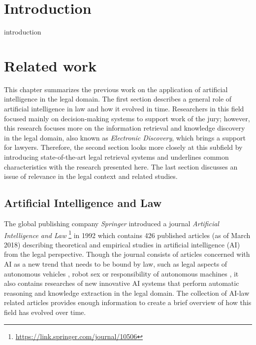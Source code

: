 \documentclass[
  digital, %
  notable,   %
  nolof,     %
  nolot,     %
  draft
]{fithesis3}
\begin{document}
\chapter*{Introduction}

introduction

\chapter{Related work}
This chapter summarizes the previous work on the application of artificial intelligence in the legal domain. 
The first section describes a general role of artificial intelligence in law and how it evolved in time.
Researchers in this field focused mainly on decision-making systems to support work of the jury; however, this research focuses more on the information retrieval and knowledge discovery in the legal domain, also known as \textit{Electronic Discovery}, which brings a support for lawyers.
Therefore, the second section looks more closely at this subfield by introducing state-of-the-art legal retrieval systems and underlines common characteristics with the research presented here.
The last section discusses an issue of relevance in the legal context and related studies.

\section{Artificial Intelligence and Law}
The global publishing company \textit{Springer} introduced a journal \textit{Artificial Intelligence and Law} \footnote{\url{https://link.springer.com/journal/10506}} in 1992 which contains 426 published articles (as of March 2018) describing theoretical and empirical studies in artificial intelligence (AI) from the legal perspective.
Though the journal consists of articles concerned with AI as a new trend that needs to be bound by law, such as legal aspects of autonomous vehicles \cite{Prakken2017autonomous}, robot sex \cite{Frank2017robotSex} or responsibility of autonomous machines \cite{Brozek2017AIresponsibility}, it also contains researches of new innovative AI systems that perform automatic reasoning and knowledge extraction in the legal domain.
The collection of AI-law related articles provides enough information to create a brief overview of how this field has evolved over time.
\end{document}
